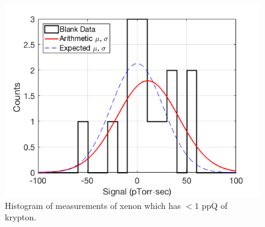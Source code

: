 \documentclass[12pt]{article}
\begin{document}
\begin{figure}[h]
  \includegraphics[width=\linewidth]{Figures/BlankHist0217.png}
  \caption{Histogram of measurements of xenon which has $<1$ ppQ of  krypton.}
  \label{fig:senstrace}
\end{figure}
\end{document}
